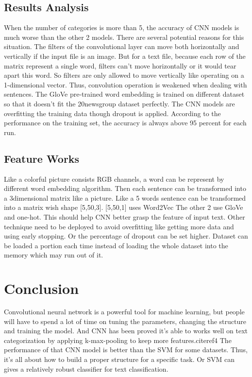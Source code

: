 \documentclass[12pt]{spieman}
\begin{document}
\begin{spacing}{1.5}
    \subsection{Results Analysis}
    When the number of categories is more than 5, the accuracy of CNN models is much worse than the other 2 models. There are several potential reasons for this situation.
    \newline
    The filters of the convolutional layer can move both horizontally and vertically if the input file is an image. But for a text file, because each row of the matrix represent a single word, filters can't move horizontally or it would tear apart this word. So filters are only allowed to move vertically like operating on a 1-dimensional vector. Thus, convolution operation is weakened when dealing with sentences.
    \newline
    The GloVe pre-trained word embedding is trained on different dataset so that it doesn't fit the 20newsgroup dataset perfectly.
    \newline
    The CNN models are overfitting the training data though dropout is applied. According to the performance on the training set, the accuracy is always above 95 percent for each run.
    \subsection{Feature Works}
    Like a colorful picture consists RGB channels, a word can be represent by different word embedding algorithm. Then each sentence can be transformed into a 3dimensional matrix like a picture. Like a 5 words sentence can be transformed into a matrix wish shape [5,50,3]. [5,50,1] uses Word2Vec The other 2 use GloVe and one-hot. This should help CNN better grasp the feature of input text.
    \newline
    Other technique need to be deployed to avoid overfitting like getting more data and using early stopping. Or the percentage of dropout can be set higher.
    \newline
    Dataset can be loaded a portion each time instead of loading the whole dataset into the memory which may run out of it.
\section{Conclusion}
Convolutional neural network is a powerful tool for machine learning, but people will have to spend a lot of time on tuning the parameters, changing the structure and training the model. And CNN has been proved it's able to works well on text categorization by applying k-max-pooling to keep more features.cite{ref4} The performance of that CNN model is better than the SVM for some datasets. Thus, it's all about how to build a proper structure for a specific task. Or SVM can gives a relatively robust classifier for text classification.





\end{spacing}
\end{document}
